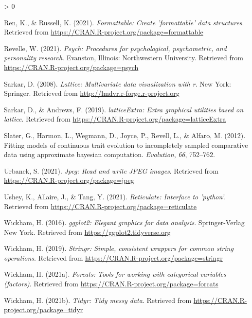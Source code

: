 \documentclass[
  english,
  man]{apa6}
\newlength{\cslhangindent}
\newenvironment{CSLReferences}[2] %
 {%
  \setlength{\parindent}{0pt}
  \ifodd #1 \everypar{\setlength{\hangindent}{\cslhangindent}}\ignorespaces\fi
  \ifnum #2 > 0
  \setlength{\parskip}{#2\baselineskip}
  \fi
 }%
 {}
\begin{document}
\begin{CSLReferences}{1}{0}
\leavevmode\hypertarget{ref-R-formattable}{}%
Ren, K., \& Russell, K. (2021). \emph{Formattable: Create 'formattable' data structures}. Retrieved from \url{https://CRAN.R-project.org/package=formattable}

\leavevmode\hypertarget{ref-R-psych}{}%
Revelle, W. (2021). \emph{Psych: Procedures for psychological, psychometric, and personality research}. Evanston, Illinois: Northwestern University. Retrieved from \url{https://CRAN.R-project.org/package=psych}

\leavevmode\hypertarget{ref-R-lattice}{}%
Sarkar, D. (2008). \emph{Lattice: Multivariate data visualization with r}. New York: Springer. Retrieved from \url{http://lmdvr.r-forge.r-project.org}

\leavevmode\hypertarget{ref-R-latticeExtra}{}%
Sarkar, D., \& Andrews, F. (2019). \emph{latticeExtra: Extra graphical utilities based on lattice}. Retrieved from \url{https://CRAN.R-project.org/package=latticeExtra}

\leavevmode\hypertarget{ref-R-geiger_c}{}%
Slater, G., Harmon, L., Wegmann, D., Joyce, P., Revell, L., \& Alfaro, M. (2012). Fitting models of continuous trait evolution to incompletely sampled comparative data using approximate bayesian computation. \emph{Evolution}, \emph{66}, 752--762.

\leavevmode\hypertarget{ref-R-jpeg}{}%
Urbanek, S. (2021). \emph{Jpeg: Read and write JPEG images}. Retrieved from \url{https://CRAN.R-project.org/package=jpeg}

\leavevmode\hypertarget{ref-R-reticulate}{}%
Ushey, K., Allaire, J., \& Tang, Y. (2021). \emph{Reticulate: Interface to 'python'}. Retrieved from \url{https://CRAN.R-project.org/package=reticulate}

\leavevmode\hypertarget{ref-R-ggplot2}{}%
Wickham, H. (2016). \emph{ggplot2: Elegant graphics for data analysis}. Springer-Verlag New York. Retrieved from \url{https://ggplot2.tidyverse.org}

\leavevmode\hypertarget{ref-R-stringr}{}%
Wickham, H. (2019). \emph{Stringr: Simple, consistent wrappers for common string operations}. Retrieved from \url{https://CRAN.R-project.org/package=stringr}

\leavevmode\hypertarget{ref-R-forcats}{}%
Wickham, H. (2021a). \emph{Forcats: Tools for working with categorical variables (factors)}. Retrieved from \url{https://CRAN.R-project.org/package=forcats}

\leavevmode\hypertarget{ref-R-tidyr}{}%
Wickham, H. (2021b). \emph{Tidyr: Tidy messy data}. Retrieved from \url{https://CRAN.R-project.org/package=tidyr}


\end{CSLReferences}
\end{document}
